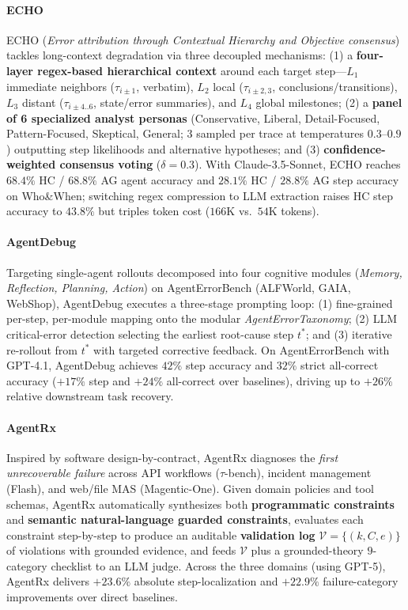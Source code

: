 \paragraph{ECHO~\citep{banerjee2025echo}}
ECHO (\emph{Error attribution through Contextual Hierarchy and Objective consensus}) tackles long-context degradation via three decoupled mechanisms: (1) a \textbf{four-layer regex-based hierarchical context} around each target step---$L_1$ immediate neighbors ($\tau_{i\pm 1}$, verbatim), $L_2$ local ($\tau_{i\pm 2,3}$, conclusions/transitions), $L_3$ distant ($\tau_{i\pm 4..6}$, state/error summaries), and $L_4$ global milestones; (2) a \textbf{panel of 6 specialized analyst personas} (Conservative, Liberal, Detail-Focused, Pattern-Focused, Skeptical, General; $3$ sampled per trace at temperatures $0.3$--$0.9$) outputting step likelihoods and alternative hypotheses; and (3) \textbf{confidence-weighted consensus voting} ($\delta=0.3$). With Claude-3.5-Sonnet, ECHO reaches $68.4\%$ HC / $68.8\%$ AG agent accuracy and $28.1\%$ HC / $28.8\%$ AG step accuracy on Who\&When; switching regex compression to LLM extraction raises HC step accuracy to $43.8\%$ but triples token cost ($166\text{K}$ vs.\ $54\text{K}$ tokens).

\paragraph{AgentDebug~\citep{zhu2026agentdebug}}
Targeting single-agent rollouts decomposed into four cognitive modules (\emph{Memory, Reflection, Planning, Action}) on AgentErrorBench (ALFWorld, GAIA, WebShop), AgentDebug executes a three-stage prompting loop: (1) fine-grained per-step, per-module mapping onto the modular \emph{AgentErrorTaxonomy}; (2) LLM critical-error detection selecting the earliest root-cause step $t^*$; and (3) iterative re-rollout from $t^*$ with targeted corrective feedback. On AgentErrorBench with GPT-4.1, AgentDebug achieves $42\%$ step accuracy and $32\%$ strict all-correct accuracy ($+17\%$ step and $+24\%$ all-correct over baselines), driving up to $+26\%$ relative downstream task recovery.

\paragraph{AgentRx~\citep{barke2026agentrx}}
Inspired by software design-by-contract, AgentRx diagnoses the \emph{first unrecoverable failure} across API workflows ($\tau$-bench), incident management (Flash), and web/file MAS (Magentic-One). Given domain policies and tool schemas, AgentRx automatically synthesizes both \textbf{programmatic constraints} and \textbf{semantic natural-language guarded constraints}, evaluates each constraint step-by-step to produce an auditable \textbf{validation log} $\mathcal{V} = \{(k, C, e)\}$ of violations with grounded evidence, and feeds $\mathcal{V}$ plus a grounded-theory $9$-category checklist to an LLM judge. Across the three domains (using GPT-5), AgentRx delivers $+23.6\%$ absolute step-localization and $+22.9\%$ failure-category improvements over direct baselines.

